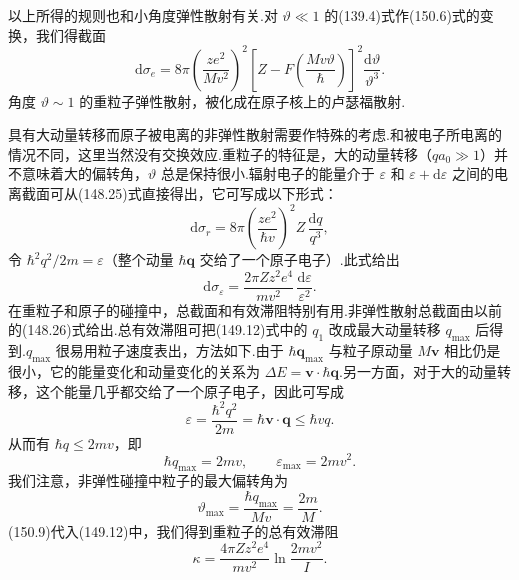 以上所得的规则也和小角度弹性散射有关.对 $\vartheta\ll1$ 的(139.4)式作(150.6)式的变换，我们得截面
\begin{equation}
  \mathrm{d}\sigma_e=8\pi\left(\frac{ze^2}{Mv^2}\right)^2
  \left[Z-F\left(\frac{Mv\vartheta}{\hbar}\right)\right]^2\frac{\mathrm{d}\vartheta}{\vartheta^3}.
\end{equation}
角度 $\vartheta\sim1$ 的重粒子弹性散射，被化成在原子核上的卢瑟福散射.

具有大动量转移而原子被电离的非弹性散射需要作特殊的考虑.和被电子所电离的情况不同，这里当然没有交换效应.重粒子的特征是，大的动量转移（$qa_0\gg1$）并不意味着大的偏转角，$\vartheta$ 总是保持很小.辐射电子的能量介于 $\varepsilon$ 和 $\varepsilon+\mathrm{d}\varepsilon$ 之间的电离截面可从(148.25)式直接得出，它可写成以下形式：
\begin{equation*}
  \mathrm{d}\sigma_r=8\pi\left(\frac{ze^2}{\hbar v}\right)^2Z\,\frac{\mathrm{d}q}{q^3},
\end{equation*}
令 $\hbar^2q^2/2m=\varepsilon$（整个动量 $\hbar\boldsymbol{q}$ 交给了一个原子电子）.此式给出
\begin{equation}
  \mathrm{d}\sigma_{\varepsilon}=\frac{2\pi Zz^2e^4}{mv^2}\,\frac{\mathrm{d}\varepsilon}{\varepsilon^2}.
\end{equation}
在重粒子和原子的碰撞中，总截面和有效滞阻特别有用.非弹性散射总截面由以前的(148.26)式给出.总有效滞阻可把(149.12)式中的 $q_1$ 改成最大动量转移 $q_{\mathrm{max}}$ 后得到.$q_{\mathrm{max}}$ 很易用粒子速度表出，方法如下.由于 $\hbar\boldsymbol{q}_{\mathrm{max}}$ 与粒子原动量 $M\boldsymbol{v}$ 相比仍是很小，它的能量变化和动量变化的关系为 $\Delta E=\boldsymbol{v}\cdot\hbar\boldsymbol{q}$.另一方面，对于大的动量转移，这个能量几乎都交给了一个原子电子，因此可写成
\begin{equation*}
  \varepsilon=\frac{\hbar^2q^2}{2m}=\hbar\boldsymbol{v}\cdot\boldsymbol{q}\leqslant\hbar vq.
\end{equation*}
从而有 $\hbar q\leqslant2mv$，即
\begin{equation}
  \hbar q_{\mathrm{max}}=2mv,\qquad \varepsilon_{\mathrm{max}}=2mv^2.
\end{equation}
我们注意，非弹性碰撞中粒子的最大偏转角为
\begin{equation*}
  \vartheta_{\mathrm{max}}=\frac{\hbar q_{\mathrm{max}}}{Mv}=\frac{2m}{M}.
\end{equation*}
(150.9)代入(149.12)中，我们得到重粒子的总有效滞阻
\begin{equation}
  \kappa=\frac{4\pi Zz^2e^4}{mv^2}\ln\frac{2mv^2}{I}.
\end{equation}

